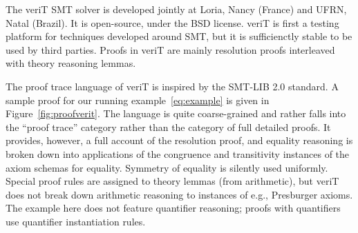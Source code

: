 \documentclass{llncs}
\begin{document}
The veriT SMT solver is developed jointly at Loria, Nancy (France) and UFRN,
Natal (Brazil).  It is open-source, under the BSD license.  veriT is first a
testing platform for techniques developed around SMT, but it is sufficienctly
stable to be used by third parties.  Proofs in veriT are mainly resolution
proofs interleaved with theory reasoning lemmas.

The proof trace language of veriT is inspired by the SMT-LIB 2.0 standard.  A
sample proof for our running example~\ref{eq:example} is given in
Figure~\ref{fig:proofverit}.  The language is quite coarse-grained and rather
falls into the ``proof trace'' category rather than the category of full detailed proofs.  It
provides, however, a full account of the resolution proof, and equality reasoning
is broken down into applications of the congruence and transitivity instances of
the axiom schemas for equality.  Symmetry of equality is silently used
uniformly.  Special proof rules are assigned to theory lemmas (from arithmetic),
but veriT does not break down arithmetic reasoning to instances of e.g.,
Presburger axioms.  The example here does not feature quantifier reasoning;
proofs with quantifiers use quantifier instantiation rules.
\end{document}
